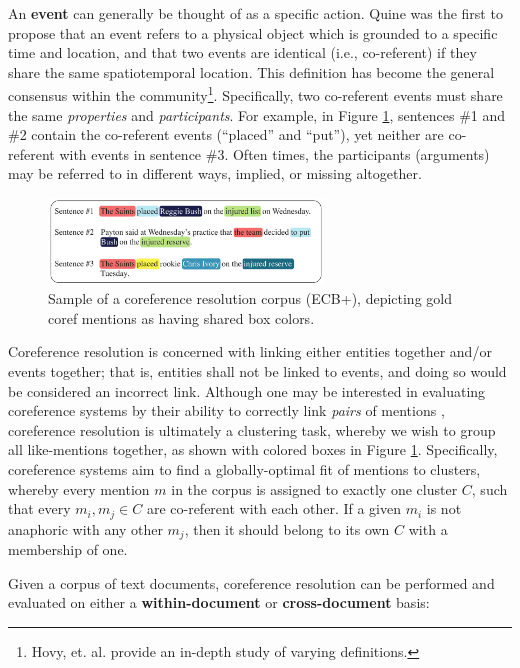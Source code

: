 An \textbf{event} can generally be thought of as a specific action.  Quine \cite{quine1985} was the first to propose that an event refers to a physical object which is grounded to a specific time and location, and that two events are identical (i.e., co-referent) if they share the same spatiotemporal location.  This definition has become the general consensus within the community\footnote{Hovy, et. al. \cite{Hovy2013EventsAN} provide an in-depth study of varying definitions.}.  Specifically, two co-referent events must share the same \textit{properties} and \textit{participants}.  For example, in Figure \ref{fig:corpus}, sentences \#1 and \#2 contain the co-referent events (``placed'' and ``put''), yet neither are co-referent with events in sentence \#3.  Often times, the participants (arguments) may be referred to in different ways, implied, or missing altogether.

\begin{figure}[ht]
\centering
	\includegraphics[width=0.65\textwidth]{graphics/corpus}
	\caption{Sample of a coreference resolution corpus (ECB+), depicting gold coref mentions as having shared box colors.}
	\label{fig:corpus}
\end{figure}

Coreference resolution is concerned with linking either entities together and/or events together; that is, entities shall not be linked to events, and doing so would be considered an incorrect link.  Although one may be interested in evaluating coreference systems by their ability to correctly link \textit{pairs} of mentions \cite{parma}, coreference resolution is ultimately a clustering task, whereby we wish to group all like-mentions together, as shown with colored boxes in Figure \ref{fig:corpus}.  Specifically, coreference systems aim to find a globally-optimal fit of mentions to clusters, whereby every mention $m$ in the corpus is assigned to exactly one cluster $C$, such that every ${m_i,m_j} \in C$ are co-referent with each other.  If a given $m_i$ is not anaphoric with any other $m_j$, then it should belong to its own $C$ with a membership of one.

Given a corpus of text documents, coreference resolution can be performed and evaluated on either a \textbf{within-document} or \textbf{cross-document} basis:

